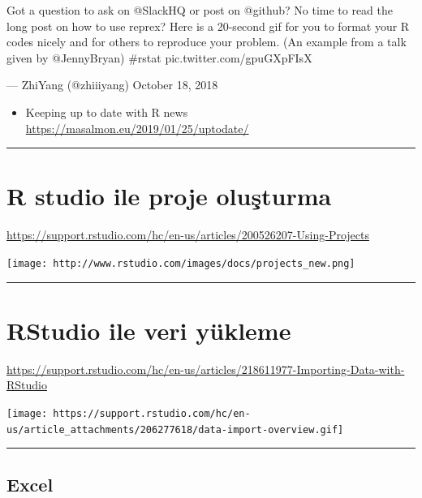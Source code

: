 \documentclass[]{article}
\providecommand{\tightlist}{%
  \setlength{\itemsep}{0pt}\setlength{\parskip}{0pt}}
\begin{document}
Got a question to ask on @SlackHQ or post on @github? No time to read
the long post on how to use reprex? Here is a 20-second gif for you to
format your R codes nicely and for others to reproduce your problem. (An
example from a talk given by @JennyBryan) \#rstat
pic.twitter.com/gpuGXpFIsX

--- ZhiYang (@zhiiiyang) October 18, 2018

\begin{itemize}
\tightlist
\item
  Keeping up to date with R news\\
  \url{https://masalmon.eu/2019/01/25/uptodate/}
\end{itemize}

\begin{center}\rule{0.5\linewidth}{\linethickness}\end{center}

\hypertarget{r-studio-ile-proje-olusturma}{%
\section{R studio ile proje
oluşturma}\label{r-studio-ile-proje-olusturma}}

\url{https://support.rstudio.com/hc/en-us/articles/200526207-Using-Projects}

\texttt{[image: http://www.rstudio.com/images/docs/projects\_new.png]}

\begin{center}\rule{0.5\linewidth}{\linethickness}\end{center}

\hypertarget{rstudio-ile-veri-yukleme}{%
\section{RStudio ile veri yükleme}\label{rstudio-ile-veri-yukleme}}

\url{https://support.rstudio.com/hc/en-us/articles/218611977-Importing-Data-with-RStudio}

\texttt{[image: https://support.rstudio.com/hc/en-us/article\_attachments/206277618/data-import-overview.gif]}

\begin{center}\rule{0.5\linewidth}{\linethickness}\end{center}

\hypertarget{excel}{%
\subsection{Excel}\label{excel}}
\end{document}
